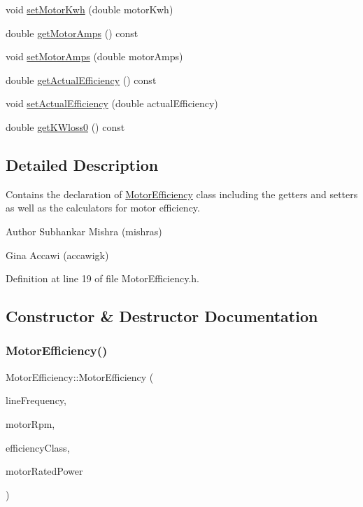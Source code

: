\begin{DoxyCompactItemize}
\item 
void \hyperlink{class_motor_efficiency_ab1c7507bac259565e43a6777d079148b}{set\+Motor\+Kwh} (double motor\+Kwh)
\item 
double \hyperlink{class_motor_efficiency_a955906509a4b49274b35c1b119c4a4b4}{get\+Motor\+Amps} () const
\item 
void \hyperlink{class_motor_efficiency_ac86aa8d6162e63eb440e07e557534c74}{set\+Motor\+Amps} (double motor\+Amps)
\item 
double \hyperlink{class_motor_efficiency_ae40031307b8631cf40df1c4069069dc0}{get\+Actual\+Efficiency} () const
\item 
void \hyperlink{class_motor_efficiency_a7a5ad8d01fdc0a3bf93d952752487496}{set\+Actual\+Efficiency} (double actual\+Efficiency)
\item 
double \hyperlink{class_motor_efficiency_a47398ac8203f5b79a0ca435673a4bc16}{get\+K\+Wloss0} () const
\end{DoxyCompactItemize}


\subsection{Detailed Description}
Contains the declaration of \hyperlink{class_motor_efficiency}{Motor\+Efficiency} class including the getters and setters as well as the calculators for motor efficiency. 

\begin{DoxyAuthor}{Author}
Subhankar Mishra (mishras) 

Gina Accawi (accawigk) 
\end{DoxyAuthor}


Definition at line 19 of file Motor\+Efficiency.\+h.



\subsection{Constructor \& Destructor Documentation}
\mbox{\label{class_motor_efficiency_a04625cbf2e8e6fea0fb1d005bd36808c}} 
\subsubsection{\texorpdfstring{Motor\+Efficiency()}{MotorEfficiency()}}
{\footnotesize\ttfamily Motor\+Efficiency\+::\+Motor\+Efficiency (\begin{DoxyParamCaption}\item[{Motor\+::\+Line\+Frequency}]{line\+Frequency,  }\item[{double}]{motor\+Rpm,  }\item[{Motor\+::\+Efficiency\+Class}]{efficiency\+Class,  }\item[{double}]{motor\+Rated\+Power }\end{DoxyParamCaption})\hspace{0.3cm}{\ttfamily [inline]}}

